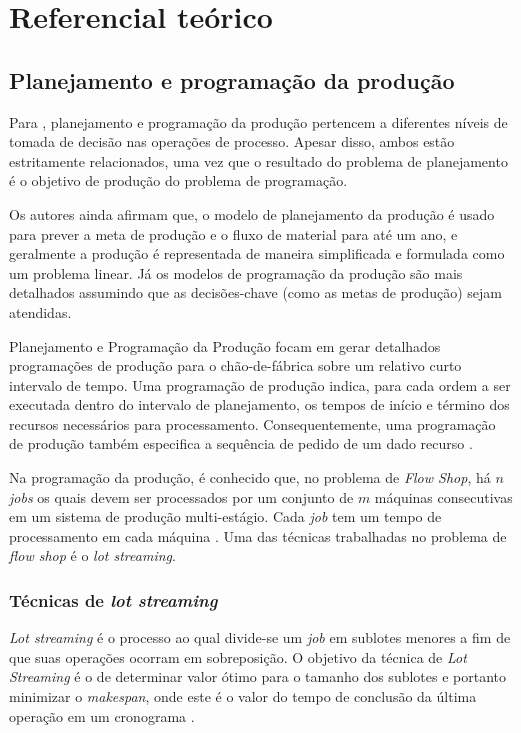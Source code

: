 \section{Referencial teórico} \label{sec:refteo}
    \subsection{Planejamento e programação da produção}
    Para , planejamento e programação da produção pertencem a diferentes níveis de tomada de decisão nas operações de processo. Apesar disso, ambos estão estritamente relacionados, uma vez que o resultado do problema de planejamento é o objetivo de produção do problema de programação.
    
    Os autores ainda afirmam que, o modelo de planejamento da produção é usado para prever a meta de produção e o fluxo de material para até um ano, e geralmente a produção é representada de maneira simplificada e formulada como um problema linear. Já os modelos de programação da produção são mais detalhados assumindo que as decisões-chave (como as metas de produção) sejam atendidas.
    
    Planejamento e Programação da Produção focam em gerar detalhados programações de produção para o chão-de-fábrica sobre um relativo curto intervalo de tempo. Uma programação de produção indica, para cada ordem a ser executada dentro do intervalo de planejamento, os tempos de início e término dos recursos necessários para processamento. Consequentemente, uma programação de produção também especifica a sequência de pedido de um dado recurso \cite{Stadtler2015}.
    
    
    
    Na programação da produção, é conhecido que, no problema de \textit{Flow Shop}, há $n$ \textit{jobs} os quais devem ser processados por um conjunto de $m$ máquinas consecutivas em um sistema de produção multi-estágio. Cada \textit{job} tem um tempo de processamento em cada máquina \cite{Pessoa2018}. Uma das técnicas trabalhadas no problema de \textit{flow shop} é o \textit{lot streaming}.
        
        \subsubsection{Técnicas de \textit{lot streaming}}
        \textit{Lot streaming} é o processo ao qual divide-se um \textit{job} em sublotes menores a fim de que suas operações ocorram em sobreposição. O objetivo da técnica de \textit{Lot Streaming} é o de determinar valor ótimo para o tamanho dos sublotes e portanto minimizar o \textit{makespan}, onde este é o valor do tempo de conclusão da última operação em um cronograma \cite{Potts1989, Baker1995, Bozek2017, Mukherjee2017}.
        
